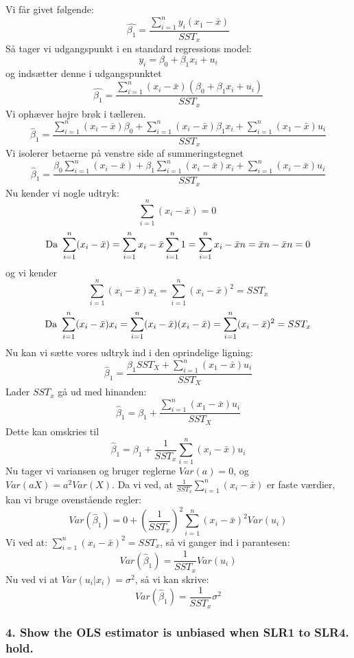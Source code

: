 \documentclass[
  10pt,
]{article}
\begin{document}
Vi får givet følgende:
\[ \hat{\beta_1}=\frac{\sum\limits_{i=1}^n y_i(x_1-\bar{x})}{SST_x}\] Så
tager vi udgangspunkt i en standard regressions model:
\[y_i=\beta_0+\beta_1x_i+u_i \] og indsætter denne i udgangspunktet
\[ \hat{\beta_1}=\frac{\sum\limits_{i=1}^n (x_i-\bar{x})(\beta_0+\beta_1x_i+u_i)}{SST_x} \]
Vi ophæver højre brøk i tælleren.
\[ \hat\beta_1 =\frac{\sum\limits_{i=1}^n (x_i-\bar{x})\beta_0 +\sum\limits_{i=1}^n (x_i-\bar{x})\beta_1x_i+\sum\limits_{i=1}^n (x_1-\bar{x})u_i} {SST_x} \]
Vi isolerer betaerne på venstre side af summeringstegnet
\[ \hat\beta_1 =\frac{\beta_0\sum\limits_{i=1}^n (x_i-\bar{x}) +\beta_1\sum\limits_{i=1}^n (x_i-\bar{x})x_i+\sum\limits_{i=1}^n (x_i-\bar{x})u_i} {SST_x} \]
Nu kender vi nogle udtryk: \[\sum\limits_{i=1}^n (x_i-\bar{x})=0\ \]
\[\text{Da}\\\ \sum\limits_{i=1}^n (x_i-\bar{x}) = \sum\limits_{i=1}^n x_i-\bar{x} \sum\limits_{i=1}^n 1=\sum\limits_{i=1}^n x_i-\bar{x}n= \bar{x}n-\bar{x}n=0 \]
og vi kender
\[\sum\limits_{i=1}^n (x_i-\bar{x})x_i=\sum\limits_{i=1}^n (x_i-\bar{x})^2=SST_x \]
\[\text{Da} \\\
\sum\limits_{i=1}^n (x_i-\bar{x})x_i = \sum\limits_{i=1}^n (x_i-\bar{x})(x_i-\bar{x})=\sum\limits_{i=1}^n (x_i-\bar{x})^2=SST_x \]
Nu kan vi sætte vores udtryk ind i den oprindelige ligning:
\[\hat\beta_1 =\frac{\beta_1 SST_X+\sum\limits_{i=1}^n (x_1-\bar{x})u_i}{SST_X} \]
Lader \(SST_x\) gå ud med hinanden:
\[\hat\beta_1 =\beta_1+\frac{ \sum\limits_{i=1}^n (x_1-\bar{x})u_i}{SST_X} \]
Dette kan omskries til
\[\hat\beta_1=\beta_1+\frac{1}{SST_x}\sum\limits_{i=1}^n(x_i-\bar{x})u_i \]
Nu tager vi variansen og bruger reglerne \(Var(a)=0\), og
\(Var(aX)=a^2Var(X)\). Da vi ved, at
\(\frac{1}{SST_x}\sum\limits_{i=1}^n(x_i-\bar{x})\) er faste værdier,
kan vi bruge ovenstående regler:
\[Var(\hat\beta_1) =0 +\left(\frac{1}{SST_x}\right)^2\sum\limits_{i=1}^n(x_i-\bar{x})^2Var(u_i) \]
Vi ved at: \(\sum\limits_{i=1}^n(x_i-\bar{x})^2 = SST_x\), så vi ganger
ind i parantesen: \[Var(\hat\beta_1) =\frac{1}{SST_x}Var(u_i) \] Nu ved
vi at \(Var(u_i|x_i)=\sigma^2\), så vi kan skrive:
\[Var(\hat\beta_1) =\frac{1}{SST_x}\sigma^2\]

\newpage

\hypertarget{show-the-ols-estimator-is-unbiased-when-slr1-to-slr4.-hold.}{%
\subsubsection{4. Show the OLS estimator is unbiased when SLR1 to SLR4.
hold.}\label{show-the-ols-estimator-is-unbiased-when-slr1-to-slr4.-hold.}}
\end{document}
